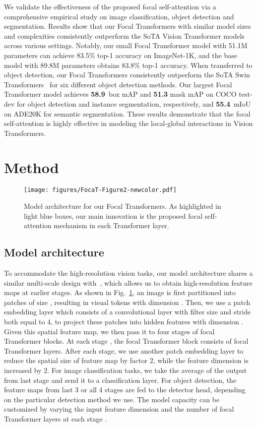 \documentclass{article}
\newcommand{\cocotestdevboxmapms}{\textbf{58.9}}
\newcommand{\adevalms}{\textbf{55.4}}
\begin{document}
We validate the effectiveness of the proposed focal self-attention via a comprehensive empirical study on  image classification, object detection and segmentation. 
Results show that our Focal Transformers with similar model sizes and complexities consistently outperform the SoTA Vision Transformer models across various settings. Notably, our small Focal Transformer model with 51.1M parameters can achieve 83.5\% top-1 accuracy on ImageNet-1K, and the base model with 89.8M parameters obtains 83.8\% top-1 accuracy. When transferred to object detection, our Focal Transformers consistently outperform the SoTA Swin Transformers~\cite{liu2021swin} for six different object detection methods. Our largest Focal Transformer model achieves \cocotestdevboxmapms~box mAP and \textbf{51.3} mask mAP on COCO test-dev for object detection and instance segmentation, respectively, and \adevalms~mIoU on ADE20K for semantic segmentation. These results demonstrate that the focal self-attention is highly effective in  modeling the local-global interactions in Vision Transformers.
 \section{Method}
\vspace{-2mm}
\begin{figure}[t!]
\centering
    \texttt{[image: figures/FocaT-Figure2-newcolor.pdf]}
  \caption{Model architecture for our Focal Transformers. As highlighted in light blue boxes, our main innovation is the proposed focal self-attention mechanism in each Transformer layer.}
  \label{fig:model_architecture}
\end{figure}
\subsection{Model architecture}

To accommodate the high-resolution vision tasks, our model architecture shares a similar multi-scale design with~\cite{wang2021pyramid,zhang2021multi,liu2021swin}, which allows us to obtain high-resolution feature maps at earlier stages. As shown in Fig.~\ref{fig:model_architecture}, an image  is first partitioned into patches of size , resulting in  visual tokens with dimension . Then, we use a patch embedding layer which consists of a convolutional layer with filter size and stride both equal to 4, to project these patches into hidden features with dimension . Given this spatial feature map, we then pass it to four stages of focal Transformer blocks. At each stage , the focal Transformer block consists of  focal Transformer layers. After each stage, we use another patch embedding layer to reduce the spatial size of feature map by factor 2, while the feature dimension is increased by 2. For image classification tasks, we take the average of the output from last stage and send it to a classification layer. For object detection, the feature maps from last 3 or all 4 stages are fed to the detector head, depending on the particular detection method we use. The model capacity can be customized by varying the input feature dimension  and the number of focal Transformer layers at each stage .
\end{document}
